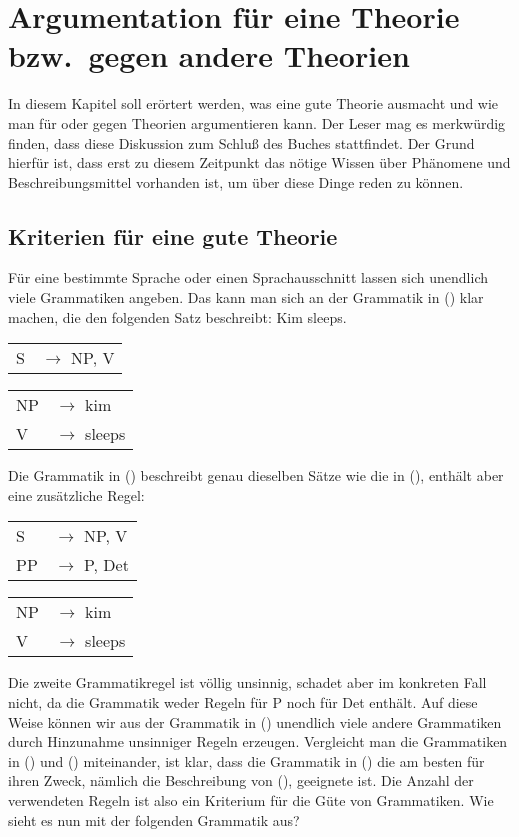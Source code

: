 
\chapter{Argumentation für eine Theorie bzw.\ gegen andere Theorien}
\label{chap-argumentation}


In diesem Kapitel soll erörtert werden, was eine gute Theorie ausmacht
und wie man für oder gegen Theorien argumentieren kann. Der Leser mag
es merkwürdig finden, dass diese Diskussion zum Schluß des Buches stattfindet.
Der Grund hierfür ist, dass erst zu diesem Zeitpunkt das nötige Wissen
über Phänomene und Beschreibungsmittel vorhanden ist, um über diese Dinge reden
zu können.


\section{Kriterien für eine gute Theorie}
\label{sec-kriterien}

Für eine bestimmte Sprache oder einen Sprachausschnitt lassen sich unendlich viele
Grammatiken angeben. Das kann man sich an der Grammatik in () klar machen,
die den folgenden Satz beschreibt:
\ea
Kim sleeps.
\z
\ea\label{gram-kim-sleeps-v}
\begin{tabular}[t]{@{}l@{ }l}       
{S}  & {$\to$ NP, V}
\end{tabular}\hspace{2cm}%
\begin{tabular}[t]{@{}l@{ }l}
{NP} & {$\to$ kim}\\
{V} & {$\to$ sleeps}\\
\end{tabular}
\z
Die Grammatik in () beschreibt genau dieselben Sätze wie die in (),
enthält aber eine zusätzliche Regel:
\ea
\begin{tabular}[t]{@{}l@{ }l}       
{S}  & {$\to$ NP, V}\\
PP   & {$\to$ P, Det}\\
\end{tabular}\hspace{2cm}%
\begin{tabular}[t]{@{}l@{ }l}
{NP} & {$\to$ kim}\\
{V} & {$\to$ sleeps}\\
\end{tabular}
\z
Die zweite Grammatikregel ist völlig unsinnig, schadet aber im konkreten Fall nicht,
da die Grammatik weder Regeln für P noch für Det enthält. Auf diese Weise können wir aus
der Grammatik in () unendlich viele andere Grammatiken durch Hinzunahme unsinniger
Regeln erzeugen. Vergleicht man die Grammatiken in () und () miteinander,
ist klar, dass die Grammatik in () die am besten für ihren Zweck, nämlich die Beschreibung
von (), geeignete ist. Die Anzahl der verwendeten Regeln ist also ein Kriterium für die
Güte von Grammatiken. Wie sieht es nun mit der folgenden Grammatik aus?

